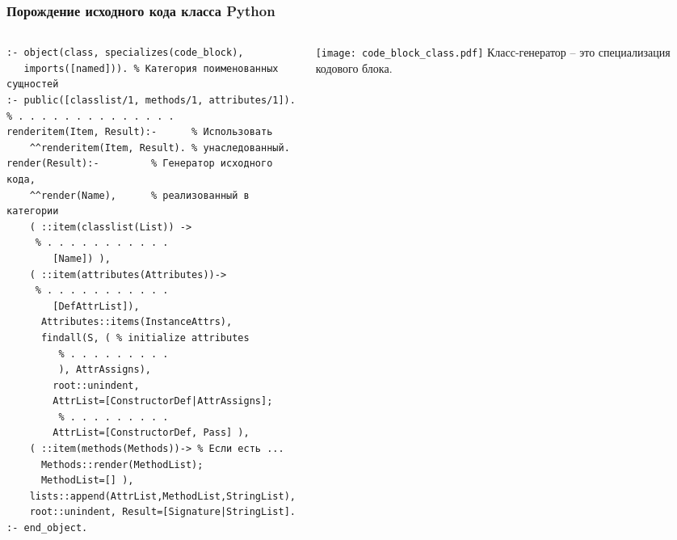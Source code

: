 \documentclass[10pt]{beamer}
\begin{document}
\begin{frame}[fragile]
  \frametitle{Порождение исходного кода класса Python}
    \begin{columns}
    \begin{column}{0.6\textwidth}
      \flushleft
\begin{verbatim}
:- object(class, specializes(code_block),
   imports([named])). % Категория поименованных сущностей
:- public([classlist/1, methods/1, attributes/1]).
% . . . . . . . . . . . . . .
renderitem(Item, Result):-      % Использовать
    ^^renderitem(Item, Result). % унаследованный.
render(Result):-         % Генератор исходного кода,
    ^^render(Name),      % реализованный в категории
    ( ::item(classlist(List)) ->
     % . . . . . . . . . . .
        [Name]) ),
    ( ::item(attributes(Attributes))->
     % . . . . . . . . . . .
        [DefAttrList]),
      Attributes::items(InstanceAttrs),
      findall(S, ( % initialize attributes
         % . . . . . . . . .
         ), AttrAssigns),
        root::unindent,
        AttrList=[ConstructorDef|AttrAssigns];
         % . . . . . . . . .
        AttrList=[ConstructorDef, Pass] ),
    ( ::item(methods(Methods))-> % Если есть ...
      Methods::render(MethodList);
      MethodList=[] ),
    lists::append(AttrList,MethodList,StringList),
    root::unindent, Result=[Signature|StringList].
:- end_object.
\end{verbatim}
    \end{column}
    \begin{column}{0.4\linewidth}
      \texttt{[image: code\_block\_class.pdf]}
        Класс-генератор -- это специализация кодового блока.
    \end{column}
  \end{columns}
\end{frame}
\end{document}
